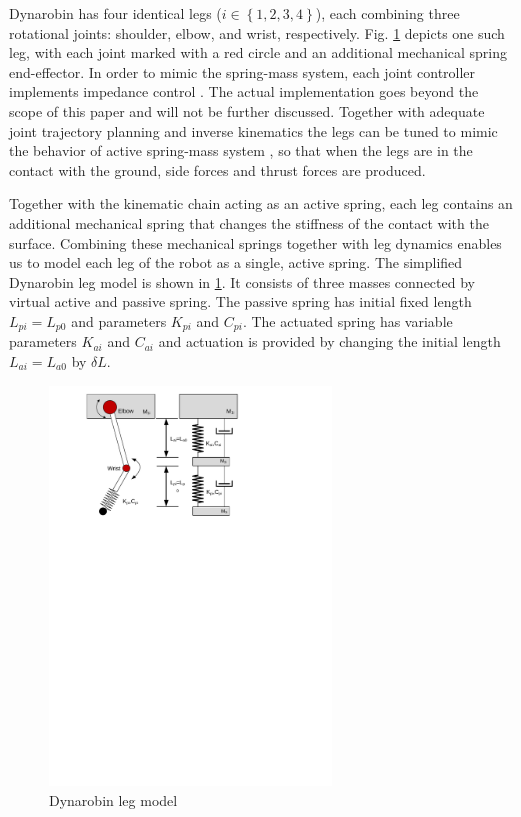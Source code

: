 

Dynarobin has four identical legs ($i\in \left \{ 1,2,3,4 \right \}$), each combining three rotational joints: shoulder, elbow, and wrist, respectively. Fig. \ref{fig:DynarobinLEG} depicts one such leg, with each joint marked with a red circle and an additional mechanical spring end-effector. In order to mimic the spring-mass system, each joint controller implements impedance control \cite{citeulike:2203614}. The actual implementation goes beyond the scope of this paper and will not be further discussed. Together with adequate joint trajectory planning and inverse kinematics the legs can be tuned to mimic the behavior of active spring-mass system \cite{conf/iros/ParkP12}\cite{6171868}, so that when the legs are in the contact with the ground, side forces and thrust forces are produced.

Together with the kinematic chain acting as an active spring, each leg contains an additional mechanical spring that changes the stiffness of the contact with the surface. Combining these mechanical springs together with leg dynamics enables us to model each leg of the robot as a single, active spring. The simplified Dynarobin leg model is shown in \ref{fig:DynarobinLEG}. It consists of three masses connected by virtual active and passive spring. The passive spring has initial fixed length $L_{pi}=L_{p0}$ and parameters $K_{pi}$ and $C_{pi}$.  The actuated spring has variable parameters $K_{ai}$ and $C_{ai}$ and actuation is provided by changing the initial length $L_{ai}=L_{a0}$ by $\delta L$.
\begin{figure}[t!]
	\centering
	\includegraphics[width=75mm]{./pictures/Dynarobin_leg.pdf}
	\caption{Dynarobin leg model}
	\label{fig:DynarobinLEG}
\end{figure}

